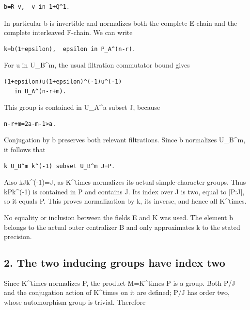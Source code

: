 \begin{Verbatim}[fontsize=\small,breaklines=true,breakanywhere=true]
b=R v,  v in 1+Q^1.
\end{Verbatim}

In particular b is invertible and normalizes both the complete E-chain
and the complete interleaved F-chain. We can write

\begin{Verbatim}[fontsize=\small,breaklines=true,breakanywhere=true]
k=b(1+epsilon),  epsilon in P_A^(n-r).
\end{Verbatim}

For u in U\_B\^{}m, the usual filtration commutator bound gives

\begin{Verbatim}[fontsize=\small,breaklines=true,breakanywhere=true]
(1+epsilon)u(1+epsilon)^(-1)u^(-1)
   in U_A^(n-r+m).
\end{Verbatim}

This group is contained in U\_A\^{}a subset J, because

\begin{Verbatim}[fontsize=\small,breaklines=true,breakanywhere=true]
n-r+m=2a-m-1>a.
\end{Verbatim}

Conjugation by b preserves both relevant filtrations. Since b normalizes
U\_B\^{}m, it follows that

\begin{Verbatim}[fontsize=\small,breaklines=true,breakanywhere=true]
k U_B^m k^(-1) subset U_B^m J=P.
\end{Verbatim}

Also kJk\^{}(-1)=J, as K\^{}times normalizes its actual simple-character
groups. Thus kPk\^{}(-1) is contained in P and contains J. Its index
over J is two, equal to {[}P:J{]}, so it equals P. This proves
normalization by k, its inverse, and hence all K\^{}times.

No equality or inclusion between the fields E and K was used. The
element b belongs to the actual outer centralizer B and only
approximates k to the stated precision.

\hypertarget{rank4_stages-the-two-inducing-groups-have-index-two}{%
\subsection{2. The two inducing groups have index
two}\label{rank4_stages-the-two-inducing-groups-have-index-two}}

Since K\^{}times normalizes P, the product M=K\^{}times P is a group.
Both P/J and the conjugation action of K\^{}times on it are defined; P/J
has order two, whose automorphism group is trivial. Therefore

